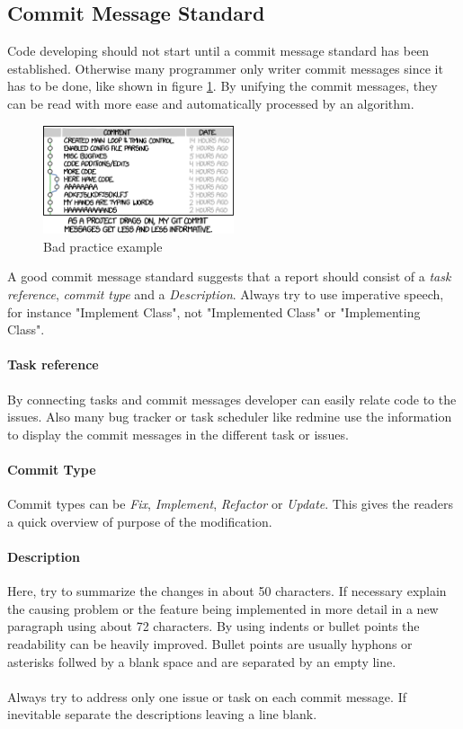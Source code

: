 \subsection{Commit Message Standard}
Code developing should not start until a commit message standard has been established. Otherwise many programmer only writer commit messages since it has to be done, like shown in figure \ref{git_commit}. By unifying the commit messages, they can be read with more ease and automatically processed by an algorithm. \\

\begin{figure}[b]
\includegraphics[width=0.5\textwidth]{images/git_commit.png}
\caption{Bad practice example}
\label{git_commit}
\end{figure}

A good commit message standard suggests that a report should consist of a \textit{task reference}, \textit{commit type} and a \textit{Description}. Always try to use imperative speech, for instance "Implement Class", not "Implemented Class" or "Implementing Class". 
\paragraph{Task reference}
By connecting tasks and commit messages developer can easily relate code to the issues. Also many bug tracker or task scheduler like redmine use the information to display the commit messages in the different task or issues.
\paragraph{Commit Type}
Commit types can be \textit{Fix}, \textit{Implement}, \textit{Refactor} or \textit{Update}. This gives the readers a quick overview of purpose of the modification.
\paragraph{Description}
Here, try to summarize the changes in about 50 characters. 
If necessary explain the causing problem or the feature being implemented in more detail in a new paragraph using about 72 characters. By using indents or bullet points the readability can be heavily improved. Bullet points are usually hyphons or asterisks follwed by a blank space and are separated by an empty line.
\\\\
Always try to address only one issue or task on each commit message. If inevitable separate the descriptions leaving a line blank.



